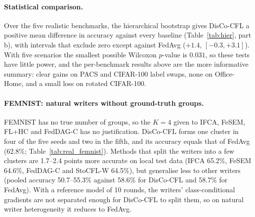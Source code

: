 \paragraph{Statistical comparison.} Over the five realistic benchmarks, the hierarchical bootstrap gives DisCo-CFL a positive mean difference in accuracy against every baseline (Table~\ref{tab:hier}, part b), with intervals that exclude zero except against FedAvg ($+1.4$, $[-0.3,+3.1]$). With five scenarios the smallest possible Wilcoxon $p$-value is $0.031$, so these tests have little power, and the per-benchmark results above are the more informative summary: clear gains on PACS and CIFAR-100 label swaps, none on Office-Home, and a small loss on rotated CIFAR-100.

\paragraph{FEMNIST: natural writers without ground-truth groups.} FEMNIST has no true number of groups, so the $K=4$ given to IFCA, FeSEM, FL+HC and FedDAG-C has no justification. DisCo-CFL forms one cluster in four of the five seeds and two in the fifth, and its accuracy equals that of FedAvg (62.8\%; Table~\ref{tab:real_femnist}). Methods that split the writers into a few clusters are 1.7--2.4 points more accurate on local test data (IFCA 65.2\%, FeSEM 64.6\%, FedDAG-C and StoCFL-W 64.5\%), but generalise less to other writers (pooled accuracy 50.7--55.3\% against 58.6\% for DisCo-CFL and 58.7\% for FedAvg). With a reference model of 10 rounds, the writers' class-conditional gradients are not separated enough for DisCo-CFL to split them, so on natural writer heterogeneity it reduces to FedAvg.

\begin{tableorg}[!htbp]
\centering
\caption{FEMNIST, 100 writers, 5 seeds. Pooled: accuracy on the pooled test sets of 20 writers. IFCA, FeSEM, FL+HC and FedDAG-C receive $K=4$.}\label{tab:real_femnist}

\end{tableorg}
